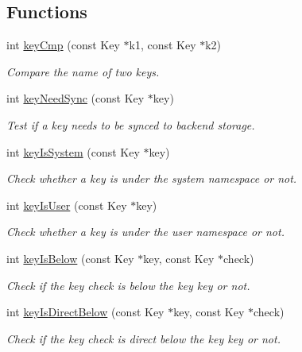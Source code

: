 \subsection*{Functions}
\begin{DoxyCompactItemize}
\item 
int \hyperlink{group__keytest_gaf6e66e12fe04d535a5d1c8218ced803e}{key\+Cmp} (const Key $\ast$k1, const Key $\ast$k2)
\begin{DoxyCompactList}\small\item\em Compare the name of two keys. \end{DoxyCompactList}\item 
int \hyperlink{group__keytest_gaf247df0de7aca04b32ef80e39ef12950}{key\+Need\+Sync} (const Key $\ast$key)
\begin{DoxyCompactList}\small\item\em Test if a key needs to be synced to backend storage. \end{DoxyCompactList}\item 
int \hyperlink{group__keytest_gafe49cfb61c2accb3073131c23a56fb14}{key\+Is\+System} (const Key $\ast$key)
\begin{DoxyCompactList}\small\item\em Check whether a key is under the {\ttfamily system} namespace or not. \end{DoxyCompactList}\item 
int \hyperlink{group__keytest_ga373acc20c6209357045891f4b0c70041}{key\+Is\+User} (const Key $\ast$key)
\begin{DoxyCompactList}\small\item\em Check whether a key is under the {\ttfamily user} namespace or not. \end{DoxyCompactList}\item 
int \hyperlink{group__keytest_ga03332b5d97c76a4fd2640aca4762b8df}{key\+Is\+Below} (const Key $\ast$key, const Key $\ast$check)
\begin{DoxyCompactList}\small\item\em Check if the key check is below the key key or not. \end{DoxyCompactList}\item 
int \hyperlink{group__keytest_ga4f175aafd98948ce6c774f3bd92b72ca}{key\+Is\+Direct\+Below} (const Key $\ast$key, const Key $\ast$check)
\begin{DoxyCompactList}\small\item\em Check if the key check is direct below the key key or not. \end{DoxyCompactList}\item 

\end{DoxyCompactItemize}
